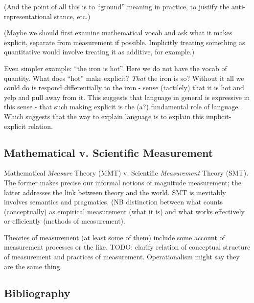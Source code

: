 \documentclass[11pt,twoside]{article}
\begin{document}
(And the point of all this is to ``ground'' meaning in practice, to
justify the anti-representational stance, etc.)

(Maybe we should first examine mathematical vocab and ask what it
makes explicit, separate from measurement if possible.  Implicitly
treating something as quantitative would involve treating it as
additive, for example.)

Even simpler example: ``the iron is hot''.  Here we do not have the
vocab of quantity.  What does ``hot'' make explicit?  \textit{That}
the iron is so?  Without it all we could do is respond differentially
to the iron - sense (tactilely) that it is hot and yelp and pull away
from it.  This suggests that language in general is expressive in this
sense - that such making explicit is the (a?) fundamental role of
language.  Which suggests that the way to explain language is to
explain this implicit-explicit relation.



\subsection{Mathematical v. Scientific Measurement}

Mathematical \textit{Measure} Theory (MMT) v. Scientific
\textit{Measurement} Theory (SMT).  The former makes precise our
informal notions of magnitude measurement; the latter addresses the
link between theory and the world.  SMT is inevitably involves
semantics and pragmatics.  (NB distinction between what counts
(conceptually) as empirical measurement (what it is) and what works
effectively or efficiently (methods of measurement).

Theories of measurement (at least some of them) include some account
of measurement processes or the like.  TODO: clarify relation of
conceptual structure of measurement and practices of measurement.
Operationalism might say they are the same thing.  

\clearpage
\appendix
\begin{appendices}
\section{Bibliography}
\printbibliography[heading=none]
\end{appendices}
\end{document}
